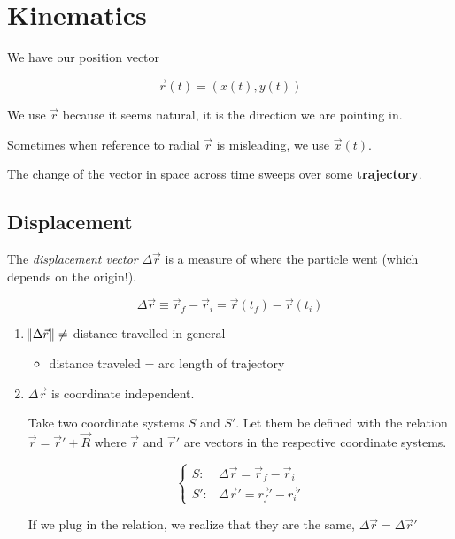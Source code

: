 \chapter{Kinematics}

We have our position vector

\begin{equation}
	\vec r(t) = (x(t), y(t))
\end{equation}

We use $\vec r$ because it seems natural, it is the direction we are pointing in.

\begin{remark}
	Sometimes when reference to radial $\vec r$ is misleading, we use $\vec x(t)$.
\end{remark}

The change of the vector in space across time sweeps over some \textbf{trajectory}.

\section{Displacement}

\begin{definition}[Displacement]
	The \textit{displacement vector} $\Delta\vec r$ is a measure of where the particle went (which depends on the origin!).

	\begin{equation}
		\Delta\vec r \equiv \vec r_f - \vec r_i = \vec r(t_f) - \vec r(t_i)
	\end{equation}
\end{definition}

\begin{enumerate}
	\item $\norm{\Delta \vec r} \neq$ distance travelled in general
	\begin{itemize}
		\item distance traveled = arc length of trajectory
	\end{itemize}

	\item $\Delta \vec r$ is coordinate independent.
	
	Take two coordinate systems $S$ and $S'$. Let them be defined with the relation $\vec r = \vec r' + \vec R$ where $\vec r$ and $\vec r'$ are vectors in the respective coordinate systems.

	\begin{equation}
		\begin{cases}
			S: &\Delta \vec r = \vec r_f - \vec r_i\\
			S':&\Delta \vec r' = \vec {r_f}' - \vec {r_i}'
		\end{cases}
	\end{equation}

	If we plug in the relation, we realize that they are the same, $\Delta \vec r = \Delta \vec r'$
\end{enumerate}

